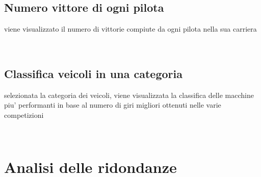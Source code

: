 \documentclass[a4paper,12pt]{report}
\begin{document}
	\subsection{Numero vittore di ogni pilota}
	viene visualizzato il numero di vittorie compiute da ogni pilota nella sua carriera
	\begin{table}[!htb]
		\centering
		\begin{center}
		\end{center}
	\end{table}\\
	\subsection{Classifica veicoli in una categoria}
	selezionata la categoria dei veicoli, viene visualizzata la classifica delle macchine piu' performanti in base al numero
	di giri migliori ottenuti nelle varie competizioni
	\begin{table}[!htb]
		\centering
		\begin{center}
		\end{center}
	\end{table}\\


	\section{Analisi delle ridondanze}
\end{document}
